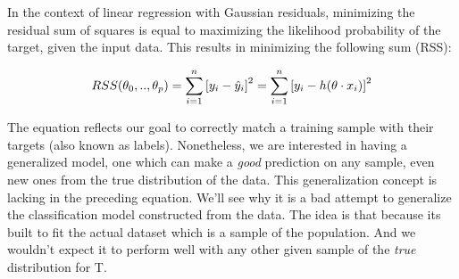In the context of linear regression with Gaussian residuals, minimizing the residual sum of squares is equal to maximizing the likelihood probability of the target, given the input data. This results in minimizing the following sum (RSS):

\begin{equation}\label{eq:rss}
RSS(\theta_0,..,\theta_p) = \sum_{i=1}^n {[y_i - \hat{y}_i ] }^2 \\
= \sum_{i=1}^n  {[y_i - h( \theta \cdot x_i)] }^2
\end{equation}

The equation reflects our goal to correctly match a training sample with their targets (also known as labels). Nonetheless, we are interested in having a generalized model, one which can make a \textit{good} prediction on any sample, even new ones from the true distribution of the data. 
This generalization concept is lacking in the preceding equation. We'll see why it is a bad attempt to generalize the classification model constructed from the data. The idea is that because its built to fit the actual dataset which is a sample of the population. And we wouldn't expect it to perform well with any other given sample of the \textit{true} distribution for $\mathrm{T}$.
